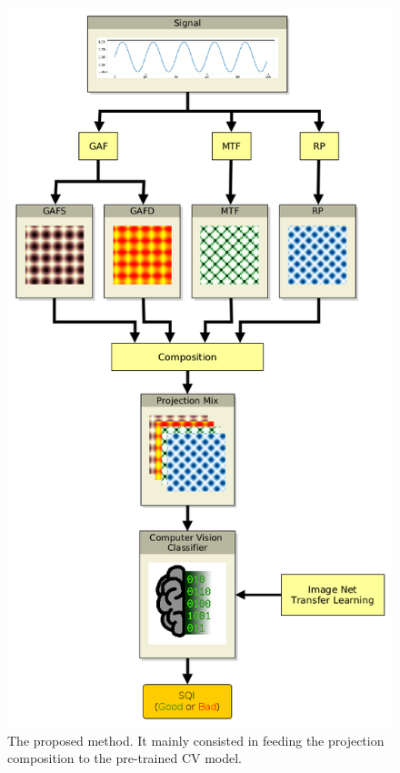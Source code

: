 \begin{figure}[t]
	\centering
	\includegraphics[height=0.95\textheight]{img/method.png}
	\caption{The proposed method. It mainly consisted in feeding the projection composition to the pre-trained \gls{CV} model.}
	\label{fig:method}
\end{figure}
